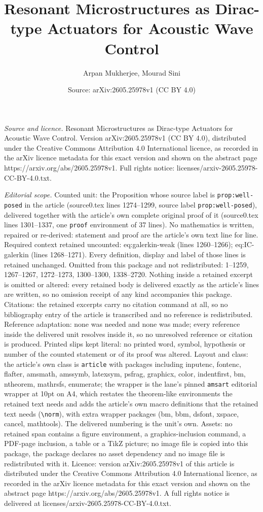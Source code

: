 \documentclass[10pt,a4paper]{amsart}
\title[Resonant Microstructures as Dirac-type Actuators for Acousti]{Resonant Microstructures as Dirac-type Actuators for Acoustic Wave Control}
\author{Arpan Mukherjee, Mourad Sini}
\date{Source: arXiv:2605.25978v1 (CC BY 4.0)}
\begin{document}
\maketitle

\noindent\emph{Source and licence.} Resonant Microstructures as Dirac-type Actuators for Acoustic Wave Control. Version arXiv:2605.25978v1 (CC BY 4.0), distributed under the Creative Commons Attribution 4.0 International licence, as recorded in the arXiv licence metadata for this exact version and shown on the abstract page https://arxiv.org/abs/2605.25978v1. Full rights notice: licenses/arxiv-2605.25978-CC-BY-4.0.txt.\par\smallskip

\noindent\textit{Editorial scope.} Counted unit: the Proposition whose source label is \texttt{prop:well-posed} in the article (source0.tex lines 1274--1299, source label \texttt{prop:well-posed}), delivered together with the article's own complete original proof of it (source0.tex lines 1301--1337, one \texttt{proof} environment of 37 lines). No mathematics is written, repaired or re-derived: statement and proof are the article's own text line for line. Required context retained uncounted: eq:galerkin-weak (lines 1260--1266); eq:IC-galerkin (lines 1268--1271). Every definition, display and label of those lines is retained unchanged. Omitted from this package and not redistributed: 1--1259, 1267--1267, 1272--1273, 1300--1300, 1338--2720. Nothing inside a retained excerpt is omitted or altered: every retained body is delivered exactly as the article's lines are written, so no omission receipt of any kind accompanies this package. Citations: the retained excerpts carry no citation command at all, so no bibliography entry of the article is transcribed and no reference is redistributed. Reference adaptation: none was needed and none was made; every reference inside the delivered unit resolves inside it, so no unresolved reference or citation is produced. Printed slips kept literal: no printed word, symbol, hypothesis or number of the counted statement or of its proof was altered. Layout and class: the article's own class is \texttt{article} with packages including inputenc, fontenc, flafter, amsmath, amssymb, latexsym, psfrag, graphicx, color, indentfirst, bm, ntheorem, mathrsfs, enumerate; the wrapper is the lane's pinned \texttt{amsart} editorial wrapper at 10pt on A4, which restates the theorem-like environments the retained text needs and adds the article's own macro definitions that the retained text needs (\texttt{\textbackslash norm}), with extra wrapper packages (bm, bbm, dsfont, xspace, cancel, mathtools). The delivered numbering is the unit's own. Assets: no retained span contains a figure environment, a graphics-inclusion command, a PDF-page inclusion, a table or a TikZ picture; no image file is copied into this package, the package declares no asset dependency and no image file is redistributed with it. Licence: version arXiv:2605.25978v1 of this article is distributed under the Creative Commons Attribution 4.0 International licence, as recorded in the arXiv licence metadata for this exact version and shown on the abstract page https://arxiv.org/abs/2605.25978v1. A full rights notice is delivered at licenses/arxiv-2605.25978-CC-BY-4.0.txt. 
\end{document}
